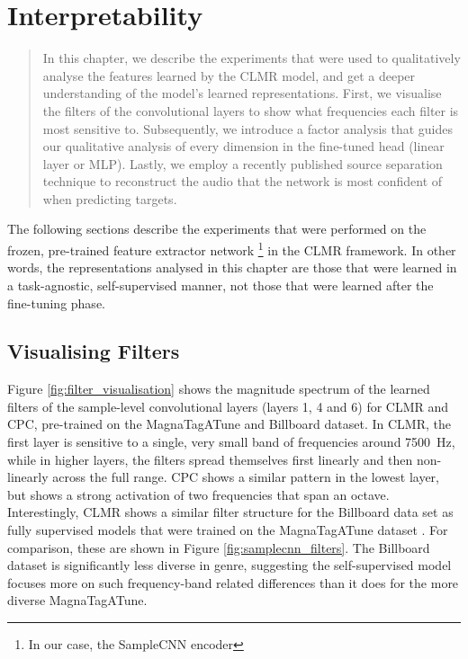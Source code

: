 \chapter{Interpretability}

\begin{quote}
    In this chapter, we describe the experiments that were used to qualitatively analyse the features learned by the CLMR model, and get a deeper understanding of the model's learned representations. First, we visualise the filters of the convolutional layers to show what frequencies each filter is most sensitive to. Subsequently, we introduce a factor analysis that guides our qualitative analysis of every dimension in the fine-tuned head (linear layer or MLP). Lastly, we employ a recently published source separation technique to reconstruct the audio that the network is most confident of when predicting targets.
\end{quote}

The following sections describe the experiments that were performed on the frozen, pre-trained feature extractor network \footnote{In our case, the SampleCNN encoder} in the CLMR framework. In other words, the representations analysed in this chapter are those that were learned in a task-agnostic, self-supervised manner, not those that were learned after the fine-tuning phase.

\section{Visualising Filters}
Figure \ref{fig:filter_visualisation} shows the magnitude spectrum of the learned filters of the sample-level convolutional layers (layers 1, 4 and 6) for CLMR and CPC, pre-trained on the MagnaTagATune and Billboard dataset.
In CLMR, the first layer is sensitive to a single, very small band of frequencies around 7500~Hz, while in higher layers, the filters spread themselves first linearly and then non-linearly across the full range.
CPC shows a similar pattern in the lowest layer, but shows a strong activation of two frequencies that span an octave.
Interestingly, CLMR shows a similar filter structure for the Billboard data set as fully supervised models that were trained on the MagnaTagATune dataset \cite{dieleman2014end,lee2018samplecnn}. For comparison, these are shown in Figure \ref{fig:samplecnn_filters}.
The Billboard dataset is significantly less diverse in genre, suggesting the self-supervised model focuses more on such frequency-band related differences than it does for the more diverse MagnaTagATune.


